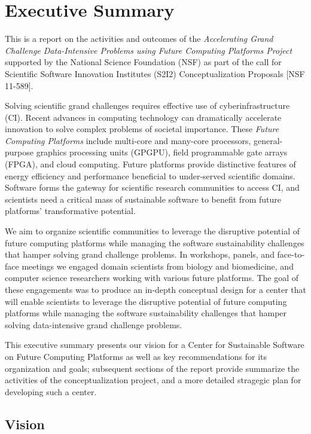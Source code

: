\section{Executive Summary}
 This is a report on the activities and outcomes of the 
\textit{Accelerating Grand Challenge Data-Intensive 
Problems using Future Computing Platforms Project}
supported by the National Science Foundation (NSF) 
as part of the call for Scientific Software Innovation Institutes (S2I2) 
Conceptualization Proposals [NSF 11-589]. 

Solving scientific grand challenges requires effective use of cyberinfrastructure (CI).
Recent advances in computing technology can dramatically accelerate innovation 
to solve complex problems of societal importance. 
These \textit{Future Computing Platforms} include 
multi-core and many-core processors,
general-purpose graphics processing units (GPGPU),
field programmable gate arrays (FPGA), and
cloud computing. 
Future platforms provide distinctive features
of energy efficiency and performance beneficial 
to under-served scientific domains. 
Software forms the gateway for scientific research communities to access CI, 
and scientists need a critical mass of
sustainable software to benefit from future platforms' transformative potential.


We aim to organize scientific communities to leverage the disruptive potential of future
computing platforms while managing the software sustainability challenges that hamper solving
grand challenge problems.
In workshops, panels, and face-to-face meetings we engaged
domain scientists from biology and biomedicine, 
and 
computer science researchers working with various future platforms.
The goal of these engagements was to produce an in-depth conceptual design 
for a center that will enable scientists to leverage the disruptive potential of future computing platforms 
while managing the software sustainability challenges that hamper solving data-intensive grand challenge problems.


This executive summary presents our vision for a Center for Sustainable Software on Future Computing Platforms as well as key recommendations for its organization and goals;
 subsequent sections of the report provide  summarize the activities of the conceptualization project, and a more detailed stragegic plan for developing such a center.

\subsection{Vision}

